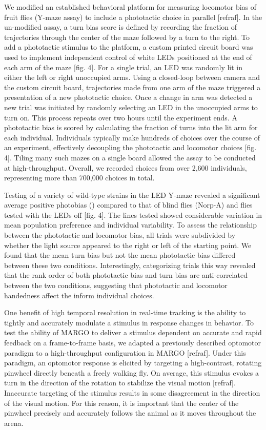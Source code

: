 \documentclass[10pt]{article}
\begin{document}
\begin{multicols}{2}
We modified an established behavioral platform for measuring locomotor bias of fruit flies (Y-maze assay) to include a phototactic choice in parallel [refraf]. In the un-modified assay, a turn bias score is defined by recording the fraction of trajectories through the center of the maze followed by a turn to the right. To add a phototactic stimulus to the platform, a custom printed circuit board was used to implement independent control of white LEDs positioned at the end of each arm of the maze [fig. 4]. For a single trial, an LED was randomly lit in either the left or right unoccupied arms. Using a closed-loop between camera and the custom circuit board, trajectories made from one arm of the maze triggered a presentation of a new phototactic choice. Once a change in arm was detected a new trial was initiated by randomly selecting an LED in the unoccupied arms to turn on. This process repeats over two hours until the experiment ends. A phototactic bias is scored by calculating the fraction of turns into the lit arm for each individual. Individuals typically make hundreds of choices over the course of an experiment, effectively decoupling the phototactic and locomotor choices [fig. 4]. Tiling many such mazes on a single board allowed the assay to be conducted at high-throughput. Overall, we recorded choices from over 2,600 individuals, representing more than 700,000 choices in total.

Testing of a variety of wild-type strains in the LED Y-maze revealed a significant average positive photobias () compared to that of blind flies (Norp-A) and flies tested with the LEDs off [fig. 4]. The lines tested showed considerable variation in mean population preference and individual variability. To assess the relationship between the phototactic and locomotor bias, all trials were subdivided by whether the light source appeared to the right or left of the starting point. We found that the mean turn bias but not the mean phototactic bias differed between these two conditions. Interestingly, categorizing trials this way revealed that the rank order of both phototactic bias and turn bias are anti-correlated between the two conditions, suggesting that phototactic and locomotor handedness affect the inform individual choices. 

One benefit of high temporal resolution in real-time tracking is the ability to tightly and accurately modulate a stimulus in response changes in behavior. To test the ability of MARGO to deliver a stimulus dependent on accurate and rapid feedback on a frame-to-frame basis, we adapted a previously described optomotor paradigm to a high-throughput configuration in MARGO [refraf]. Under this paradigm, an optomotor response is elicited by targeting a high-contrast, rotating pinwheel directly beneath a freely walking fly. On average, this stimulus evokes a turn in the direction of the rotation to stabilize the visual motion [refraf]. Inaccurate targeting of the stimulus results in some disagreement in the direction of the visual motion. For this reason, it is important that the center of the pinwheel precisely and accurately follows the animal as it moves throughout the arena.


\end{multicols}
\end{document}
